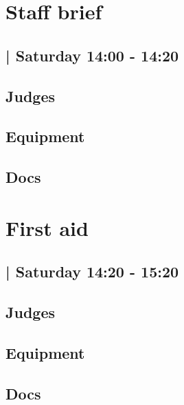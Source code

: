 \documentclass[10pt]{article}
\begin{document}
		\begin{minipage}{\linewidth}
		\setcounter{section}{40}
	\section{Staff brief }
	\subsection*{ | Saturday 14:00 - 14:20}

	

	\begin{multicols}{2}
	\subsection*{\faUsers \: Judges}
	\begin{itemize}
		\end{itemize}
	\columnbreak
	\subsection*{\faWrench \: Equipment}
	        \vfill\null
        \subsection*{\faFile \: Docs}
     	\end{multicols}


	\vspace{1cm}
	\end{minipage}

		\begin{minipage}{\linewidth}
		\setcounter{section}{41}
	\section{First aid }
	\subsection*{ | Saturday 14:20 - 15:20}

	

	\begin{multicols}{2}
	\subsection*{\faUsers \: Judges}
	\begin{itemize}
		\end{itemize}
	\columnbreak
	\subsection*{\faWrench \: Equipment}
	        \vfill\null
        \subsection*{\faFile \: Docs}
     	\end{multicols}


	\vspace{1cm}
	\end{minipage}
\end{document}
